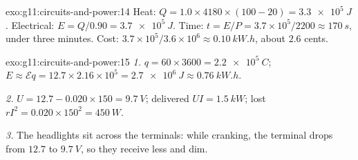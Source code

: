 \begin{solution}{exo:g11:circuits-and-power:14}
Heat: $Q = 1.0 \times 4180 \times (100 - 20) = \qty{3.3e5}{J}$.
Electrical: $E = Q/0.90 = \qty{3.7e5}{J}$. Time: $t = E/P =
3.7\times10^{5}/2200 \approx \qty{170}{s}$, under three minutes. Cost:
$3.7\times10^{5}/3.6\times10^{6} \approx \qty{0.10}{kW.h}$, about $2.6$
cents.
\end{solution}

\begin{solution}{exo:g11:circuits-and-power:15}
\emph{1.} $q = 60 \times 3600 = \qty{2.2e5}{C}$; $E \approx \mathcal{E}q
= 12.7 \times 2.16\times10^{5} = \qty{2.7e6}{J} \approx \qty{0.76}{kW.h}$.

\emph{2.} $U = 12.7 - 0.020 \times 150 = \qty{9.7}{V}$; delivered
$UI = \qty{1.5}{kW}$; lost $rI^2 = 0.020 \times 150^2 = \qty{450}{W}$.

\emph{3.} The headlights sit across the terminals: while cranking, the
terminal  drops from $12.7$ to $\qty{9.7}{V}$, so they receive
less  and dim.
\end{solution}

